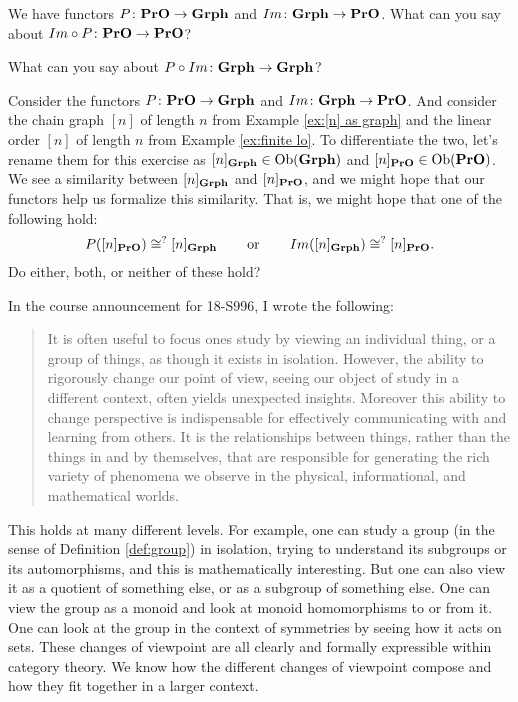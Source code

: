 \documentclass[CT4S-EN-RU]{subfiles}
\begin{document}
\begin{exerciseRUS}
\end{exerciseRUS}

\begin{exerciseENG}
We have functors $P\colon{\bf PrO}\rightarrow{\bf Grph}$ and $Im\colon{\bf Grph}\rightarrow{\bf PrO}$.
\sexc What can you say about $Im\circ P\colon{\bf PrO}\rightarrow{\bf PrO}$?
\item What can you say about $P\circ Im\colon{\bf Grph}\rightarrow{\bf Grph}$?
\endsexc
\end{exerciseENG}

\begin{exerciseRUS}
\end{exerciseRUS}

\begin{exerciseENG}
Consider the functors $P\colon{\bf PrO}\rightarrow{\bf Grph}$ and $Im\colon{\bf Grph}\rightarrow{\bf PrO}$. And consider the chain graph $[n]$ of length $n$ from Example \ref{ex:[n] as graph} and the linear order $[n]$ of length $n$ from Example \ref{ex:finite lo}. To differentiate the two, let's rename them for this exercise as $[n]_{{\bf Grph}}\in\textnormal{Ob}({\bf Grph})$ and $[n]_{{\bf PrO}}\in\textnormal{Ob}({\bf PrO})$. We see a similarity between $[n]_{{\bf Grph}}$ and $[n]_{{\bf PrO}}$, and we might hope that our functors help us formalize this similarity. That is, we might hope that one of the following hold: 
$$P([n]_{{\bf PrO}})\cong^? [n]_{{\bf Grph}}\hspace{.3in}\textnormal{or}\hspace{.3in} Im([n]_{{\bf Grph}})\cong^? [n]_{{\bf PrO}}.$$ 
Do either, both, or neither of these hold?
\end{exerciseENG}

\begin{exerciseRUS}
\end{exerciseRUS}

\begin{remarkENG}
In the course announcement for 18-S996, I wrote the following:
\begin{quote}
It is often useful to focus ones study by viewing an individual thing, or a group of things, as though it exists in isolation. However, the ability to rigorously change our point of view, seeing our object of study in a different context, often yields unexpected insights. Moreover this ability to change perspective is indispensable for effectively communicating with and learning from others. It is the relationships between things, rather than the things in and by themselves, that are responsible for generating the rich variety of phenomena we observe in the physical, informational, and mathematical worlds.
\end{quote}
This holds at many different levels. For example, one can study a group (in the sense of Definition \ref{def:group}) in isolation, trying to understand its subgroups or its automorphisms, and this is mathematically interesting. But one can also view it as a quotient of something else, or as a subgroup of something else. One can view the group as a monoid and look at monoid homomorphisms to or from it. One can look at the group in the context of symmetries by seeing how it acts on sets. These changes of viewpoint are all clearly and formally expressible within category theory. We know how the different changes of viewpoint compose and how they fit together in a larger context. 
\end{remarkENG}
\end{document}
